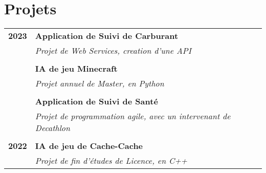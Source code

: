 \documentclass[a4paper, 12pt]{article}
\begin{document}
\begin{minipage}[t]{0.65\textwidth}
    \vspace{-0.4cm}

    \section*{\textcolor{sectioncolor}{Projets}}
    \begin{tabular}{ m{} m{} }
        \textbf{2023} & \textbf{Application de Suivi de Carburant} \\
        & \textit{Projet de Web Services, creation d'une API} \\
        & \\
        & \textbf{IA de jeu Minecraft} \\
        & \textit{Projet annuel de Master, en Python} \\
        & \\
        & \textbf{Application de Suivi de Santé} \\
        & \textit{Projet de programmation agile, avec un intervenant de Decathlon} \\
        & \\
        \textbf{2022} & \textbf{IA de jeu de Cache-Cache} \\
        & \textit{Projet de fin d'études de Licence, en C++} \\
    \end{tabular}

    \vspace{-0.4cm}


\end{minipage}
\end{document}
